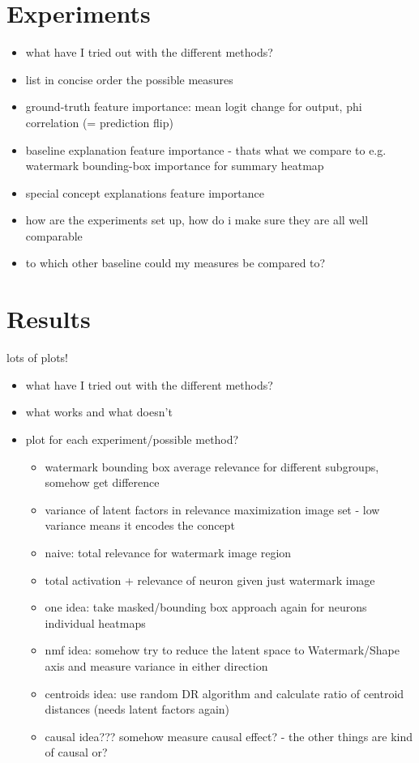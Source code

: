 \section{Experiments}
\begin{itemize}
    \item what have I tried out with the different methods?
    \item list in concise order the possible measures
    \item ground-truth feature importance: mean logit change for output, phi correlation (= prediction flip)
    \item baseline explanation feature importance - thats what we compare to e.g. watermark bounding-box importance for summary heatmap
    \item special concept explanations feature importance
    \item how are the experiments set up, how do i make sure they are all well comparable
    \item to which other baseline could my measures be compared to?
\end{itemize}

\section{Results}
lots of plots!
\begin{itemize}
    \item what have I tried out with the different methods?
    \item what works and what doesn't
    \item plot for each experiment/possible method?
          \begin{itemize}
              \item watermark bounding box average relevance for different subgroups, somehow get difference
              \item variance of latent factors in relevance maximization image set - low variance means it encodes the concept
              \item naive: total relevance for watermark image region
              \item total activation + relevance of neuron given just watermark image
              \item one idea: take masked/bounding box approach again for neurons individual heatmaps
              \item nmf idea: somehow try to reduce the latent space to Watermark/Shape axis and measure variance in either direction
              \item centroids idea: use random DR algorithm and calculate ratio of centroid distances (needs latent factors again)
              \item causal idea??? somehow measure causal effect? - the other things are kind of causal or?
          \end{itemize}
\end{itemize}



